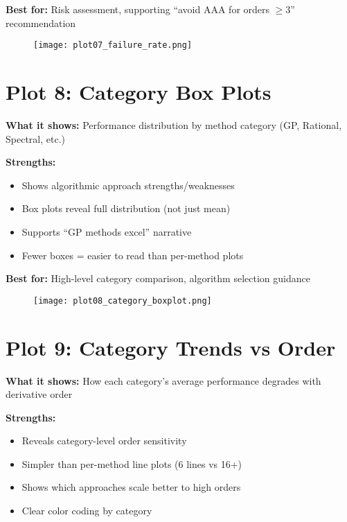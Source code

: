 \documentclass[11pt]{article}
\begin{document}
\textbf{Best for:} Risk assessment, supporting ``avoid AAA for orders $\geq 3$'' recommendation

\begin{figure}[h]
\centering
\texttt{[image: plot07\_failure\_rate.png]}
\end{figure}

\clearpage


\section*{Plot 8: Category Box Plots}

\textbf{What it shows:} Performance distribution by method category (GP, Rational, Spectral, etc.)

\textbf{Strengths:}
\begin{itemize}
    \item Shows algorithmic approach strengths/weaknesses
    \item Box plots reveal full distribution (not just mean)
    \item Supports ``GP methods excel'' narrative
    \item Fewer boxes = easier to read than per-method plots
\end{itemize}

\textbf{Best for:} High-level category comparison, algorithm selection guidance

\begin{figure}[h]
\centering
\texttt{[image: plot08\_category\_boxplot.png]}
\end{figure}

\clearpage


\section*{Plot 9: Category Trends vs Order}

\textbf{What it shows:} How each category's average performance degrades with derivative order

\textbf{Strengths:}
\begin{itemize}
    \item Reveals category-level order sensitivity
    \item Simpler than per-method line plots (6 lines vs 16+)
    \item Shows which approaches scale better to high orders
    \item Clear color coding by category
\end{itemize}
\end{document}

